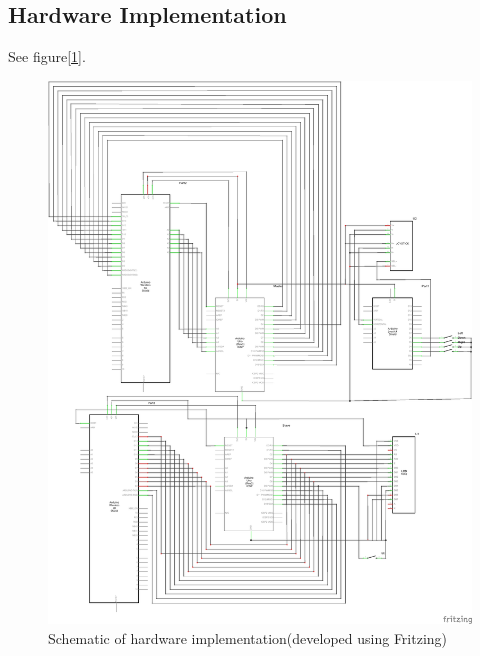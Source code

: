 \subsection{Hardware Implementation}
See figure[\ref{fig:schm}].
\begin{figure}[!htbp]
	\centering
	\includegraphics[width = \linewidth]{images/schem.png}
	\caption{Schematic of hardware implementation(developed using Fritzing)}
	\label{fig:schm}
\end{figure}

